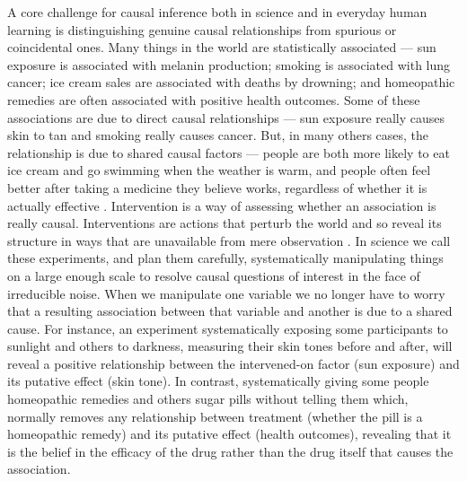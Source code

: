 \documentclass{cambridge7A}%
\newcommand{\ttodo}[2][]{\vspace{0.1cm} \hfil \todo[caption={\textbf{TG}}, size=\footnotesize, color = orange, inline, #1]{#2}}
\begin{document}
A core challenge for causal inference both in science and in everyday human learning is distinguishing genuine causal relationships from spurious or coincidental ones.  Many things in the world are statistically associated --- sun exposure is associated with melanin production; smoking is associated with lung cancer;  %
ice cream sales are associated with deaths by drowning; and homeopathic remedies are often associated with positive health outcomes.  Some of these associations are due to direct causal relationships --- sun exposure really causes skin to tan and smoking really causes cancer. %
But, in many others cases, the relationship is due to shared causal factors --- people are both more likely to eat ice cream and go swimming when the weather is warm, %
and people often feel better after taking a medicine they believe works, regardless of whether it is actually effective \citep{di2001influence}.  Intervention is a way of assessing whether an association is really causal.  Interventions are actions that perturb the world and so reveal its structure in ways that are unavailable from mere observation \citep{woodward2003making}.  In science we call these experiments, and plan them carefully, systematically manipulating things on a large enough scale to resolve causal questions of interest in the face of irreducible noise.  When we manipulate one variable we no longer have to worry that a resulting association between that variable and another is due to a shared cause.  For instance, an experiment systematically exposing some participants to sunlight and others to darkness, measuring their skin tones before and after, will reveal a positive relationship between the intervened-on factor (sun exposure) and its putative effect (skin tone).  %
In contrast, systematically giving some people homeopathic remedies and others sugar pills without telling them which, normally removes any relationship between treatment (whether the pill is a homeopathic remedy) and its putative effect (health outcomes), revealing that it is the belief in the efficacy of the drug rather than the drug itself that causes the association.  
\ttodo{i'd remove the last paragraph about homeopathy}
\end{document}

